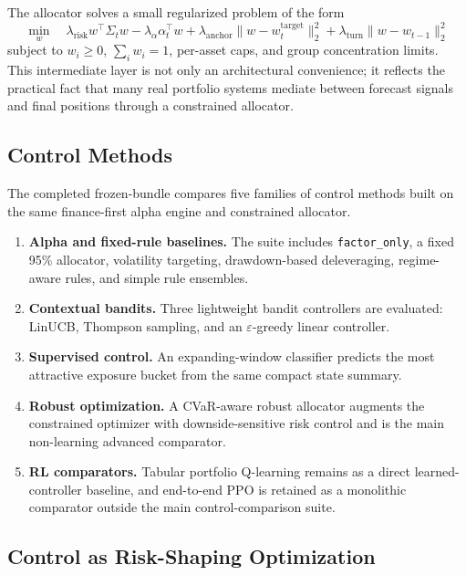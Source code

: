 \documentclass[11pt]{article}
\begin{document}
The allocator solves a small regularized problem of the form
\[
\min_w \quad
\lambda_{\mathrm{risk}} w^\top \Sigma_t w
- \lambda_{\alpha}\alpha_t^\top w
+ \lambda_{\mathrm{anchor}}\lVert w - w_t^{\mathrm{target}} \rVert_2^2
+ \lambda_{\mathrm{turn}}\lVert w - w_{t-1} \rVert_2^2
\]
subject to $w_i \ge 0$, $\sum_i w_i = 1$, per-asset caps, and group
concentration limits. This intermediate layer is not only an architectural
convenience; it reflects the practical fact that many real portfolio systems
mediate between forecast signals and final positions through a constrained
allocator.

\subsection{Control Methods}

The completed frozen-bundle compares five families of control methods built on
the same finance-first alpha engine and constrained allocator.
\begin{enumerate}[leftmargin=1.5em, itemsep=2pt, topsep=4pt]
\item \textbf{Alpha and fixed-rule baselines.} The suite includes
      \texttt{factor\_only}, a fixed 95\% allocator, volatility targeting,
      drawdown-based deleveraging, regime-aware rules, and simple rule
      ensembles.
\item \textbf{Contextual bandits.} Three lightweight bandit controllers are
      evaluated: LinUCB, Thompson sampling, and an $\varepsilon$-greedy linear
      controller.
\item \textbf{Supervised control.} An expanding-window classifier predicts the
      most attractive exposure bucket from the same compact state summary.
\item \textbf{Robust optimization.} A CVaR-aware robust allocator augments the
      constrained optimizer with downside-sensitive risk control and is the main
      non-learning advanced comparator.
\item \textbf{RL comparators.} Tabular portfolio Q-learning remains as a direct
      learned-controller baseline, and end-to-end PPO is retained as a
      monolithic comparator outside the main control-comparison suite.
\end{enumerate}

\subsection{Control as Risk-Shaping Optimization}
\end{document}
